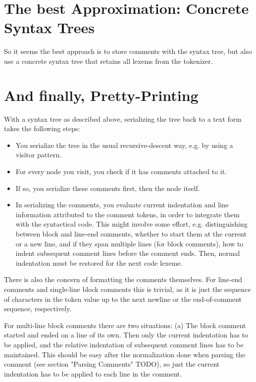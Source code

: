 \documentclass[11pt,a4paper]{article}
\begin{document}
\section{The best Approximation: Concrete Syntax Trees}

So it seems the best approach is to store comments with the syntax tree, but
also use a concrete syntax tree that retains all lexems from the tokenizer. 



\section{And finally, Pretty-Printing}

With a syntax tree as described above, serializing the tree back to a text form
takes the following steps:

\begin{itemize}
\item You serialize the tree in the usual recursive-descent way, e.g. by using a
visitor pattern.
\item For every node you visit, you check if it has comments attached to it.
\item If so, you serialize these comments first, then the node itself.
\item In serializing the comments, you evaluate current indentation and line
information attributed to the comment tokens, in order to integrate them with
the syntactical code. This might involve some effort, e.g. distinguishing
between block and line-end comments, whether to start them at the current or a
new line, and if they span multiple lines (for block comments), how to indent
subsequent comment lines before the comment ends. Then, normal indentation
must be restored for the next code lexeme.
\end{itemize}

There is also the concern of formatting the comments themselves. For line-end
comments and single-line block comments this is trivial, as it is just the
sequence of characters in the token value up to the next newline or the
end-of-comment sequence, respectively.

For multi-line block comments there are two situations: (a) The block comment
started and ended on a line of its own. Then only the current indentation has to
be applied, and the relative indentation of subsequent comment lines has to be
maintained.  This should be easy after the normalization done when parsing the
comment (see section "Parsing Comments" TODO), so just the current indentation
has to be applied to each line in the comment.
\end{document}
